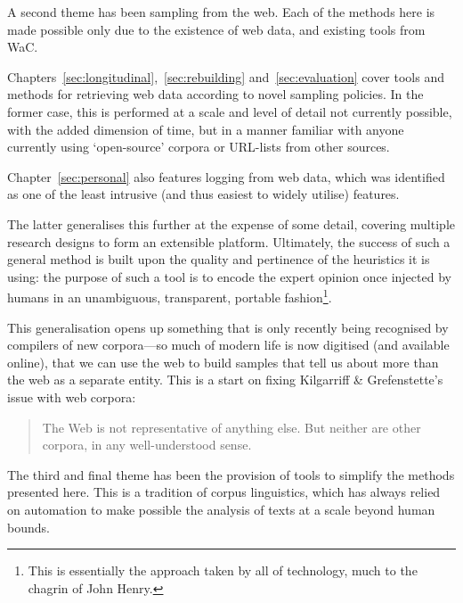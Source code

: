 A second theme has been sampling from the web.  Each of the methods here is made possible only due to the existence of web data, and existing tools from WaC.

Chapters~\ref{sec:longitudinal},~\ref{sec:rebuilding} and~\ref{sec:evaluation} cover tools and methods for retrieving web data according to novel sampling policies.  In the former case, this is performed at a scale and level of detail not currently possible, with the added dimension of time, but in a manner familiar with anyone currently using `open-source' corpora or URL-lists from other sources.

Chapter~\ref{sec:personal} also features logging from web data, which was identified as one of the least intrusive (and thus easiest to widely utilise) features.

The latter generalises this further at the expense of some detail, covering multiple research designs to form an extensible platform.  Ultimately, the success of such a general method is built upon the quality and pertinence of the heuristics it is using: the purpose of such a tool is to encode the expert opinion once injected by humans in an unambiguous, transparent, portable fashion\footnote{This is essentially the approach taken by all of technology, much to the chagrin of John Henry.}.

This generalisation opens up something that is only recently being recognised by compilers of new corpora---so much of modern life is now digitised (and available online), that we can use the web to build samples that tell us about more than the web as a separate entity.  This is a start on fixing Kilgarriff \& Grefenstette's issue with web corpora\cite[p. 343]{kilgarriff2003introduction}:

\begin{quote}
The Web is not representative of anything else. But neither are other corpora, in any well-understood sense.
\end{quote}


The third and final theme has been the provision of tools to simplify the methods presented here.  This is a tradition of corpus linguistics, which has always relied on automation to make possible the analysis of texts at a scale beyond human bounds.


